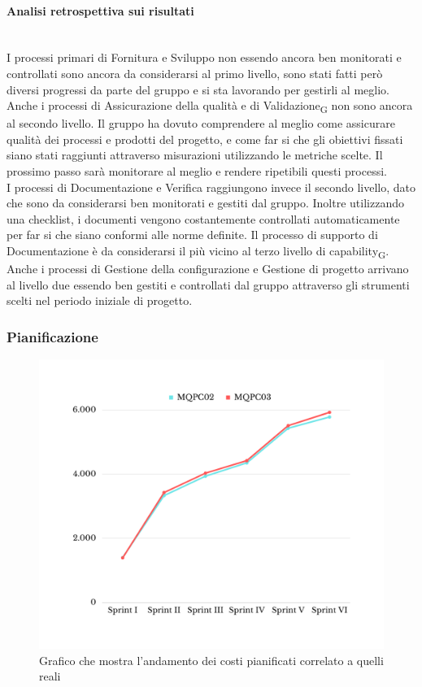 \paragraph{Analisi retrospettiva sui risultati}\mbox{}\\
I processi primari di Fornitura e Sviluppo non essendo ancora ben monitorati e controllati sono ancora da considerarsi al primo livello, sono stati fatti però diversi progressi da parte del gruppo e si sta lavorando per gestirli al meglio.\\
Anche i processi di Assicurazione della qualità e di Validazione\textsubscript{G} non sono ancora al secondo livello. Il gruppo ha dovuto comprendere al meglio come assicurare qualità dei processi e prodotti del progetto, e come far si che gli obiettivi fissati siano stati raggiunti attraverso misurazioni utilizzando le metriche scelte. Il prossimo passo sarà monitorare al meglio e rendere ripetibili questi processi.\\
I processi di Documentazione e Verifica raggiungono invece il secondo livello, dato che sono da considerarsi ben monitorati e gestiti dal gruppo. Inoltre utilizzando una checklist, i documenti vengono costantemente controllati automaticamente per far si che siano conformi alle norme definite. Il processo di supporto di Documentazione è da considerarsi il più vicino al terzo livello di capability\textsubscript{G}.\\
Anche i processi di Gestione della configurazione e Gestione di progetto arrivano al livello due essendo ben gestiti e controllati dal gruppo attraverso gli strumenti scelti nel periodo iniziale di progetto.
\subsubsection{Pianificazione}
\begin{figure}[H]
	\centering
	\includegraphics[scale=0.5]{img/BCWS-ACWS.png}
	\caption{Grafico che mostra l'andamento dei costi pianificati correlato a quelli reali}
\end{figure}
